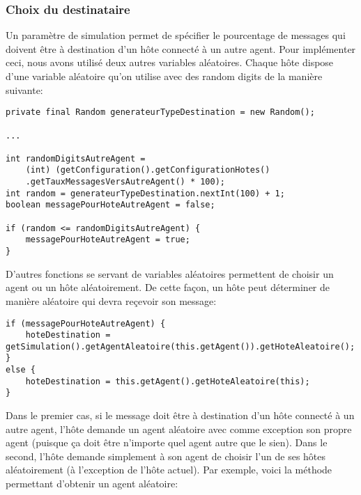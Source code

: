 \documentclass[a4paper,11pt]{article}
\begin{document}
\subsubsection*{Choix du destinataire}
Un paramètre de simulation permet de spécifier le pourcentage de messages qui doivent être à destination d'un hôte connecté à un autre agent. Pour implémenter ceci, nous avons utilisé deux autres variables aléatoires. Chaque hôte dispose d'une variable aléatoire qu'on utilise avec des random digits de la manière suivante:

\begin{lstlisting}[caption=Choix du type de destinataire d'un message]
private final Random generateurTypeDestination = new Random();

...

int randomDigitsAutreAgent =
	(int) (getConfiguration().getConfigurationHotes()
	.getTauxMessagesVersAutreAgent() * 100);
int random = generateurTypeDestination.nextInt(100) + 1;
boolean messagePourHoteAutreAgent = false;

if (random <= randomDigitsAutreAgent) {
	messagePourHoteAutreAgent = true;
}
\end{lstlisting}










\clearpage

D'autres fonctions se servant de variables aléatoires permettent de choisir un agent ou un hôte aléatoirement. De cette façon, un hôte peut déterminer de manière aléatoire qui devra reçevoir son message:

\begin{lstlisting}[caption=Hote - Choix de la destination]
if (messagePourHoteAutreAgent) {
	hoteDestination = getSimulation().getAgentAleatoire(this.getAgent()).getHoteAleatoire();
}
else {
	hoteDestination = this.getAgent().getHoteAleatoire(this);
}
\end{lstlisting}




\clearpage

Dans le premier cas, si le message doit être à destination d'un hôte connecté à un autre agent, l'hôte demande un agent aléatoire avec comme exception son propre agent (puisque ça doit être n'importe quel agent autre que le sien). Dans le second, l'hôte demande simplement à son agent de choisir l'un de ses hôtes aléatoirement (à l'exception de l'hôte actuel). Par exemple, voici la méthode permettant d'obtenir un agent aléatoire:
\end{document}
